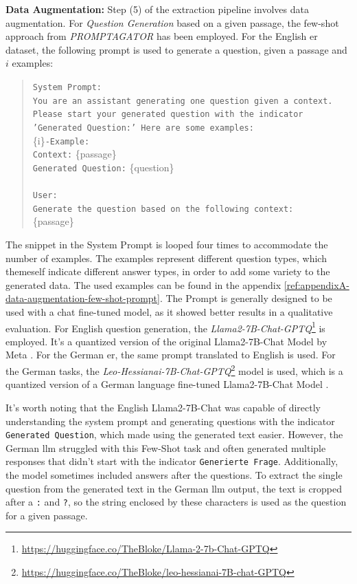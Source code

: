 \textbf{Data Augmentation:} Step (5) of the extraction pipeline involves data augmentation. For \textit{Question Generation} based on a given passage, the few-shot approach from \textit{PROMPTAGATOR} \cite{dai_promptagator_2022} has been employed. For the English \gls{er} dataset, the following prompt is used to generate a question, given a passage and $i$ examples:

\begin{quote}
   \texttt{System Prompt:}\\
    \texttt{You are an assistant generating one question given a context. Please start your generated question with the indicator 'Generated Question:' Here are some examples:} \\
   \{i\}\texttt{-Example:} \\
   \texttt{Context:} \{passage\} \\
    \texttt{Generated Question:} \{question\} \\ \\
    \texttt{User:} \\
    \texttt{Generate the question based on the following context:}\\
    \{passage\}
    \label{prompt:system-prompt-data-generation}
\end{quote}

The snippet in the System Prompt is looped four times to accommodate the number of examples. The examples represent different question types, which themeself indicate different answer types, in order to add some variety to the generated data. The used examples can be found in the appendix \ref{ref:appendixA-data-augmentation-few-shot-prompt}. The Prompt is generally designed to be used with a chat fine-tuned model, as it showed better results in a qualitative evaluation. For English question generation, the \textit{Llama2-7B-Chat-GPTQ}\footnote{\url{https://huggingface.co/TheBloke/Llama-2-7b-Chat-GPTQ}} is employed. It's a quantized version of the original Llama2-7B-Chat Model by Meta \cite{touvron_llama_2023}. For the German \gls{er}, the same prompt translated to English is used. For the German tasks, the \textit{Leo-Hessianai-7B-Chat-GPTQ}\footnote{\url{https://huggingface.co/TheBloke/leo-hessianai-7B-chat-GPTQ}} model is used, which is a quantized version of a German language fine-tuned Llama2-7B-Chat Model \cite{pluster_leolm_2023}.

It's worth noting that the English Llama2-7B-Chat was capable of directly understanding the system prompt and generating questions with the indicator \texttt{Generated Question}, which made using the generated text easier. However, the German \gls{llm} struggled with this Few-Shot task and often generated multiple responses that didn't start with the indicator \texttt{Generierte Frage}. Additionally, the model sometimes included answers after the questions. To extract the single question from the generated text in the German \gls{llm} output, the text is cropped after a \texttt{:} and \texttt{?}, so the string enclosed by these characters is used as the question for a given passage. 


